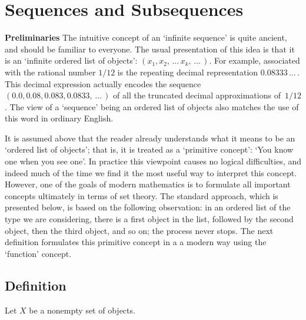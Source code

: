 \VV


                        \section{Sequences and Subsequences}                        
                            \label{SectA40}

\V

        {\bf Preliminaries} The intuitive concept of an `infinite sequence' is quite ancient, and should be familiar to everyone.
    The usual presentation of this idea is that it is an `infinite ordered list of objects': $(x_{1}, x_{2},\,{\ldots}\,x_{k},\,{\ldots}\,)$.
    For example, associated with the rational number $1/12$ is the repeating decimal representation $0.08333\,{\ldots}\,$.
    This decimal expression actually encodes the sequence $(0.0, 0.08, 0.083, 0.0833,\,{\ldots}\,)$ of all the truncated decimal approximations of~$1/12$.
    The view of a `sequence' being an ordered list of objects also matches the use of this word in ordinary English.

        It is assumed above that the reader already understands what it means to be an `ordered list of objects';
    that is, it is treated as a `primitive concept': `You know one when you see one'.
    In practice this viewpoint causes no logical difficulties, and indeed much of the time we find it the most useful way to interpret this concept.      
    However, one of the goals of modern mathematics is to formulate all important concepts ultimately in terms of set theory.
    The standard approach, which is presented below, is based on the following observation:
    in an ordered list of the type we are considering, there is a first object in the list,
    followed by the second object, then the third object, and so on; the process never stops.
    The next definition formulates this primitive concept in a a modern way using the `function' concept.

\V

        \subsection{\small{{\bf Definition}}}
        \label{DefA40.20}

\V

        Let $X$ be a nonempty set of objects.

\V

